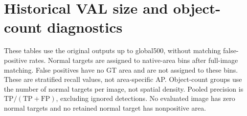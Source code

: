 \documentclass[10pt,letterpaper]{article}
\begin{document}
\section{Historical VAL size and object-count diagnostics}
These tables use the original outputs up to global500, without matching false-positive rates. Normal targets are assigned to native-area bins after full-image matching. False positives have no GT area and are not assigned to these bins. These are stratified recall values, not area-specific AP. Object-count groups use the number of normal targets per image, not spatial density. Pooled precision is $\mathrm{TP}/(\mathrm{TP}+\mathrm{FP})$, excluding ignored detections. No evaluated image has zero normal targets and no retained normal target has nonpositive area.
\begin{table}[h!]
\centering\small\setlength{\tabcolsep}{6pt}
\caption{Historical VAL recall (R, \%) by native annotation area in pixels squared; GT is normal-target count. HyCADO is the 800 configuration.}

\end{table}
\begin{table}[h!]
\centering\footnotesize\setlength{\tabcolsep}{4pt}
\caption{Historical VAL recall difference, pooled precision, and FP counts by object count. Differences are HyCADO-800 minus YOLO-1280.}

\end{table}
\clearpage
\end{document}
